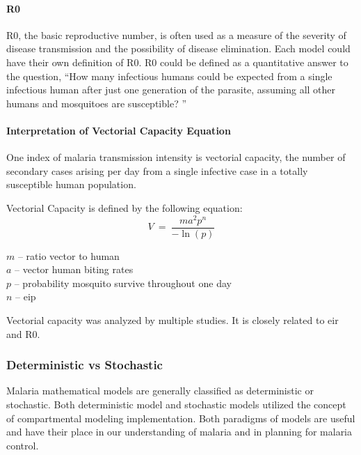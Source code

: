 \documentclass[a4paper, 12pt, twoside]{article}
\begin{document}
\paragraph{\texorpdfstring{\gls{R0}}{R0}}%
\label{par:R0}
\gls{R0}, the basic reproductive number, is often used as a measure of the severity of disease transmission and the possibility of disease elimination.
Each model could have their own definition of \gls{R0}.
\gls{R0} could be defined as a quantitative answer to the question, “How many infectious humans could be expected from a single infectious human after just one generation of the parasite, assuming all other humans and mosquitoes are susceptible? ”

\paragraph{Interpretation of Vectorial Capacity Equation}%
\label{par:interpretation_of_vectorial_capacity_equation}

One index of malaria transmission intensity is vectorial capacity, the number of secondary cases arising per day from a single infective case in a totally susceptible human population.

Vectorial Capacity is defined by the following equation:
\begin{equation}
	V\ =\ \frac{ma^2p^n}{-\ln{\left(p\right)}}
\end{equation}

\begin{centering}
	$m$ – ratio vector to human\\
	$a$ – vector human biting rates\\
	$p$	– probability mosquito survive throughout one day\\
	$n$	–	\gls{eip}
\end{centering}

Vectorial capacity was analyzed by multiple studies\cite{LeMenach2007a,Bomblies2009b,Briet2019,AnjuViswan2019,Molineaux1978,Gerardin2017,Bomblies2014,Weaver2010a}.
It is closely related to \gls{eir} and \gls{R0}.

\subsubsection{Deterministic vs Stochastic}
\label{subsubsec:deterministic_vs_stochastic}

Malaria mathematical models are generally classified as deterministic or stochastic.
Both deterministic model and stochastic models utilized the concept of compartmental modeling implementation.
Both paradigms of models are useful and have their place in our understanding of malaria and in planning for malaria control.
\end{document}
